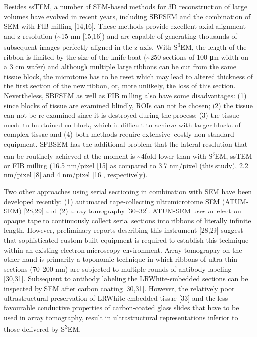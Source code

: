 \documentclass{article}
\begin{document}
Besides ssTEM, a number of SEM-based methods for 3D reconstruction of large volumes have evolved in recent years, including SBFSEM and the combination of SEM with FIB milling [14,16]. These methods provide excellent axial alignment and z-resolution (\textasciitilde{}15 nm [15,16]) and are capable of generating thousands of subsequent images perfectly aligned in the z-axis. With S\textsuperscript{3}EM, the length of the ribbon is limited by the size of the knife boat (\textasciitilde{}250 sections of 100 μm width on a 3 cm wafer) and although multiple large ribbons can be cut from the same tissue block, the microtome has to be reset which may lead to altered thickness of the first section of the new ribbon, or, more unlikely, the loss of this section. Nevertheless, SBFSEM as well as FIB milling also have some disadvantages: (1) since blocks of tissue are examined blindly, ROIs can not be chosen; (2) the tissue can not be re-examined since it is destroyed during the process; (3) the tissue needs to be stained en-block, which is difficult to achieve with larger blocks of complex tissue and (4) both methods require extensive, costly non-standard equipment. SFBSEM has the additional problem that the lateral resolution that can be routinely achieved at the moment is \textasciitilde{}4fold lower than with S\textsuperscript{3}EM, ssTEM or FIB milling (16.5 nm/pixel [15] as compared to 3.7 nm/pixel (this study), 2.2 nm/pixel [8] and 4 nm/pixel [16], respectively).

Two other approaches using serial sectioning in combination with SEM have been developed recently: (1) automated tape-collecting ultramicrotome SEM (ATUM-SEM) [28,29] and (2) array tomography [30–32]. ATUM-SEM uses an electron opaque tape to continuously collect serial sections into ribbons of literally infinite length. However, preliminary reports describing this instrument [28,29] suggest that sophisticated custom-built equipment is required to establish this technique within an existing electron microscopy environment. Array tomography on the other hand is primarily a toponomic technique in which ribbons of ultra-thin sections (70–200 nm) are subjected to multiple rounds of antibody labeling [30,31]. Subsequent to antibody labeling the LRWhite-embedded sections can be inspected by SEM after carbon coating [30,31]. However, the relatively poor ultrastructural preservation of LRWhite-embedded tissue [33] and the less favourable conductive properties of carbon-coated glass slides that have to be used in array tomography, result in ultrastructural representations inferior to those delivered by S\textsuperscript{3}EM.
\end{document}
